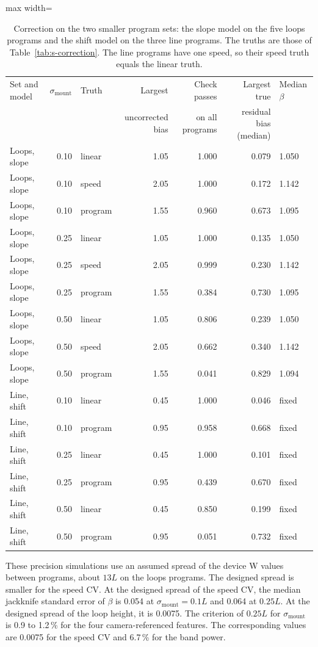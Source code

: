 \documentclass[11pt,a4paper]{article}
\begin{document}
\begin{table}[ht]
\centering
\caption{Correction on the two smaller program sets: the slope model on the five loops programs and the shift model on the three line programs.
The truths are those of Table~\ref{tab:s-correction}.
The line programs have one speed, so their speed truth equals the linear truth.}
\label{tab:s-small}
\begin{adjustbox}{max width=\linewidth}\begin{tabular}{@{}lrlrrrl@{}}
\toprule
Set and model & $\sigma_\mathrm{mount}$ & Truth & Largest & Check passes & Largest true & Median $\beta$ \\
 & & & uncorrected bias & on all programs & residual bias (median) & \\
\midrule
Loops, slope & 0.10 & linear & 1.05 & 1.000 & 0.079 & 1.050 \\
Loops, slope & 0.10 & speed & 2.05 & 1.000 & 0.172 & 1.142 \\
Loops, slope & 0.10 & program & 1.55 & 0.960 & 0.673 & 1.095 \\
Loops, slope & 0.25 & linear & 1.05 & 1.000 & 0.135 & 1.050 \\
Loops, slope & 0.25 & speed & 2.05 & 0.999 & 0.230 & 1.142 \\
Loops, slope & 0.25 & program & 1.55 & 0.384 & 0.730 & 1.095 \\
Loops, slope & 0.50 & linear & 1.05 & 0.806 & 0.239 & 1.050 \\
Loops, slope & 0.50 & speed & 2.05 & 0.662 & 0.340 & 1.142 \\
Loops, slope & 0.50 & program & 1.55 & 0.041 & 0.829 & 1.094 \\
Line, shift & 0.10 & linear & 0.45 & 1.000 & 0.046 & fixed \\
Line, shift & 0.10 & program & 0.95 & 0.958 & 0.668 & fixed \\
Line, shift & 0.25 & linear & 0.45 & 1.000 & 0.101 & fixed \\
Line, shift & 0.25 & program & 0.95 & 0.439 & 0.670 & fixed \\
Line, shift & 0.50 & linear & 0.45 & 0.850 & 0.199 & fixed \\
Line, shift & 0.50 & program & 0.95 & 0.051 & 0.732 & fixed \\
\bottomrule
\end{tabular}\end{adjustbox}
\end{table}

These precision simulations use an assumed spread of the device W values between programs, about $13L$ on the loops programs.
The designed spread is smaller for the speed CV.
At the designed spread of the speed CV, the median jackknife standard error of $\beta$ is 0.054 at $\sigma_\mathrm{mount}=0.1L$ and 0.064 at $0.25L$.
At the designed spread of the loop height, it is 0.0075.
The criterion of $0.25L$ for $\sigma_\mathrm{mount}$ is 0.9 to 1.2\,\% for the four camera-referenced features.
The corresponding values are 0.0075 for the speed CV and 6.7\,\% for the band power.
\end{document}
